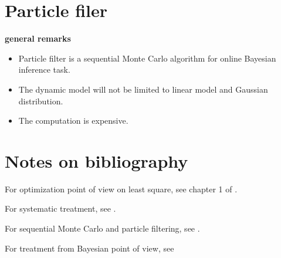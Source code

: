 \begin{refsection}
\section{Particle filer}
\begin{mdframed}
\textbf{general remarks}
\begin{itemize}
	\item Particle filter is a sequential Monte Carlo algorithm for online Bayesian inference task.
	\item The dynamic model will not be limited to linear model and Gaussian distribution.
	\item The computation is expensive.
\end{itemize}
\end{mdframed}



\section{Notes on bibliography}

For optimization point of view on least square, see chapter 1 of \cite{bertsekas2016nonlinear}.

For systematic treatment, see \cite{kailath2000linear}\cite{crassidis2011optimal}.

For sequential Monte Carlo and particle filtering, see \cite{bruno2013sequential}.

For treatment from Bayesian point of view, see \cite{sarkka2013bayesian}

\printbibliography

\end{refsection}


